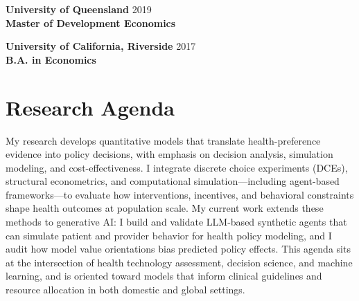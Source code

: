 \documentclass[11pt, letterpaper]{article}
\begin{document}
\vspace{0.5em}
\noindent \textbf{University of Queensland} \hfill 2019 \\
\textbf{Master of Development Economics}

\vspace{0.5em}
\noindent \textbf{University of California, Riverside} \hfill 2017 \\
\textbf{B.A. in Economics}

\section*{Research Agenda}
\vspace{0.3em}
My research develops quantitative models that translate health-preference evidence into policy decisions, with emphasis on decision analysis, simulation modeling, and cost-effectiveness. I integrate discrete choice experiments (DCEs), structural econometrics, and computational simulation---including agent-based frameworks---to evaluate how interventions, incentives, and behavioral constraints shape health outcomes at population scale. My current work extends these methods to generative AI: I build and validate LLM-based synthetic agents that can simulate patient and provider behavior for health policy modeling, and I audit how model value orientations bias predicted policy effects. This agenda sits at the intersection of health technology assessment, decision science, and machine learning, and is oriented toward models that inform clinical guidelines and resource allocation in both domestic and global settings.
\end{document}
